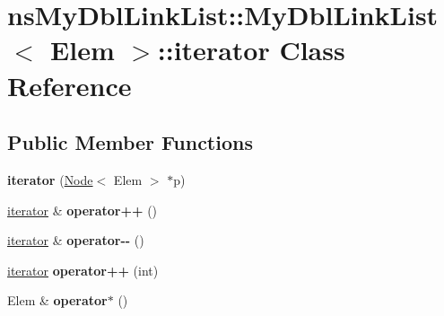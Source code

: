 \hypertarget{classnsMyDblLinkList_1_1MyDblLinkList_1_1iterator}{\section{ns\-My\-Dbl\-Link\-List\-:\-:My\-Dbl\-Link\-List$<$ Elem $>$\-:\-:iterator Class Reference}
\label{classnsMyDblLinkList_1_1MyDblLinkList_1_1iterator}
}
\subsection*{Public Member Functions}
\begin{DoxyCompactItemize}
\item 
\hypertarget{classnsMyDblLinkList_1_1MyDblLinkList_1_1iterator_a0a03daec3feadac5e779fa19eb0043bf}{{\bfseries iterator} (\hyperlink{structnsMyDblLinkList_1_1Node}{Node}$<$ Elem $>$ $\ast$p)}\label{classnsMyDblLinkList_1_1MyDblLinkList_1_1iterator_a0a03daec3feadac5e779fa19eb0043bf}

\item 
\hypertarget{classnsMyDblLinkList_1_1MyDblLinkList_1_1iterator_a0fe70fac59d4d62c80babea825f941a4}{\hyperlink{classnsMyDblLinkList_1_1MyDblLinkList_1_1iterator}{iterator} \& {\bfseries operator++} ()}\label{classnsMyDblLinkList_1_1MyDblLinkList_1_1iterator_a0fe70fac59d4d62c80babea825f941a4}

\item 
\hypertarget{classnsMyDblLinkList_1_1MyDblLinkList_1_1iterator_aa45611fe3370cc1fc305a75d1a2beb82}{\hyperlink{classnsMyDblLinkList_1_1MyDblLinkList_1_1iterator}{iterator} \& {\bfseries operator-\/-\/} ()}\label{classnsMyDblLinkList_1_1MyDblLinkList_1_1iterator_aa45611fe3370cc1fc305a75d1a2beb82}

\item 
\hypertarget{classnsMyDblLinkList_1_1MyDblLinkList_1_1iterator_ac13d5aaccc691771acc6fa716ef9c838}{\hyperlink{classnsMyDblLinkList_1_1MyDblLinkList_1_1iterator}{iterator} {\bfseries operator++} (int)}\label{classnsMyDblLinkList_1_1MyDblLinkList_1_1iterator_ac13d5aaccc691771acc6fa716ef9c838}

\item 
\hypertarget{classnsMyDblLinkList_1_1MyDblLinkList_1_1iterator_ae6d5f2d24ce61de8d55264bae3a90354}{Elem \& {\bfseries operator$\ast$} ()}\label{classnsMyDblLinkList_1_1MyDblLinkList_1_1iterator_ae6d5f2d24ce61de8d55264bae3a90354}


\end{DoxyCompactItemize}
